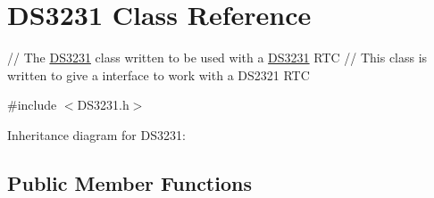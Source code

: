 \hypertarget{classDS3231}{}\section{D\+S3231 Class Reference}
\label{classDS3231}


// The \hyperlink{classDS3231}{D\+S3231} class written to be used with a \hyperlink{classDS3231}{D\+S3231} R\+TC  // This class is written to give a interface to work with a D\+S2321 R\+TC  




{\ttfamily \#include $<$D\+S3231.\+h$>$}



Inheritance diagram for D\+S3231\+:
\subsection*{Public Member Functions}
